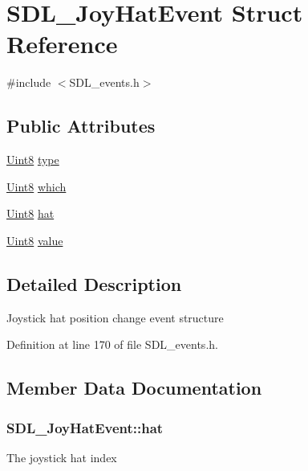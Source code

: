 \hypertarget{struct_s_d_l___joy_hat_event}{}\section{S\+D\+L\+\_\+\+Joy\+Hat\+Event Struct Reference}
\label{struct_s_d_l___joy_hat_event}


{\ttfamily \#include $<$S\+D\+L\+\_\+events.\+h$>$}

\subsection*{Public Attributes}
\begin{DoxyCompactItemize}
\item 
\hyperlink{_s_d_l__stdinc_8h_a2944638813a090aa23e62f4da842c3e2}{Uint8} \hyperlink{struct_s_d_l___joy_hat_event_a1592071b54de4fe74c087945f43a1d3f}{type}
\item 
\hyperlink{_s_d_l__stdinc_8h_a2944638813a090aa23e62f4da842c3e2}{Uint8} \hyperlink{struct_s_d_l___joy_hat_event_a73ba3817ba1265f3878012c21462e74a}{which}
\item 
\hyperlink{_s_d_l__stdinc_8h_a2944638813a090aa23e62f4da842c3e2}{Uint8} \hyperlink{struct_s_d_l___joy_hat_event_ab1b54a6d1091e583e856f86b5af1e2f6}{hat}
\item 
\hyperlink{_s_d_l__stdinc_8h_a2944638813a090aa23e62f4da842c3e2}{Uint8} \hyperlink{struct_s_d_l___joy_hat_event_a52b179a34407449941b61d988ca72ef4}{value}
\end{DoxyCompactItemize}


\subsection{Detailed Description}
Joystick hat position change event structure 

Definition at line 170 of file S\+D\+L\+\_\+events.\+h.



\subsection{Member Data Documentation}
\hypertarget{struct_s_d_l___joy_hat_event_ab1b54a6d1091e583e856f86b5af1e2f6}{}
\subsubsection[{hat}]{ S\+D\+L\+\_\+\+Joy\+Hat\+Event\+::hat}\label{struct_s_d_l___joy_hat_event_ab1b54a6d1091e583e856f86b5af1e2f6}
The joystick hat index 

